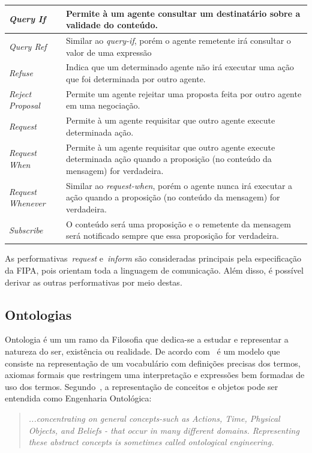 \begin{table}
\begin{tabular}{|p{3cm} | p{12cm} |}
		\hline
		\emph{Query If} & Permite à um agente consultar um destinatário sobre a validade do conteúdo.	\\
		\hline
		\emph{Query Ref} & Similar ao \emph{query-if}, porém o agente remetente irá consultar o valor de uma expressão	\\
		\hline
		\emph{Refuse} & Indica que um determinado agente não irá executar uma ação que foi determinada por outro agente.	\\
		\hline
		\emph{Reject Proposal} & Permite um agente rejeitar uma proposta feita por outro agente em uma negociação.	\\
		\hline
		\emph{Request} & Permite à um agente requisitar que outro agente execute determinada ação.	\\
		\hline
		\emph{Request When} & Permite à um agente requisitar que outro agente execute determinada ação quando a proposição (no conteúdo da mensagem) for verdadeira.	\\
		\hline
		\emph{Request Whenever} & Similar ao \emph{request-when}, porém o agente nunca irá executar a ação quando a proposição (no conteúdo da mensagem) for verdadeira.	\\
		\hline
		\emph{Subscribe} & O conteúdo será uma proposição e o remetente da mensagem será notificado sempre que essa proposição for verdadeira.	\\
		\hline
	\end{tabular}
	\label{table:fipa-cal-spec}
\end{table}

As performativas~\emph{request} e~\emph{inform} são consideradas principais pela especificação da FIPA, pois orientam toda a linguagem de comunicação. Além disso, é possível derivar as outras performativas por meio destas.

\subsection{Ontologias}

Ontologia é um um ramo da Filosofia que dedica-se a estudar e representar a natureza do ser, existência ou realidade. De acordo com~\cite{kim2006towards} é um modelo que consiste na representação de um vocabulário com definições precisas dos termos, axiomas formais que restringem uma interpretação e expressões bem formadas de uso dos termos. Segundo~\cite{novig95}, a representação de conceitos e objetos pode ser entendida como Engenharia Ontológica:

\begin{quote}
\emph{...concentrating on general concepts-such as Actions, Time, Physical Objects, and Beliefs - that occur in many different domains. Representing these abstract concepts is sometimes called ontological engineering.}
\end{quote}

